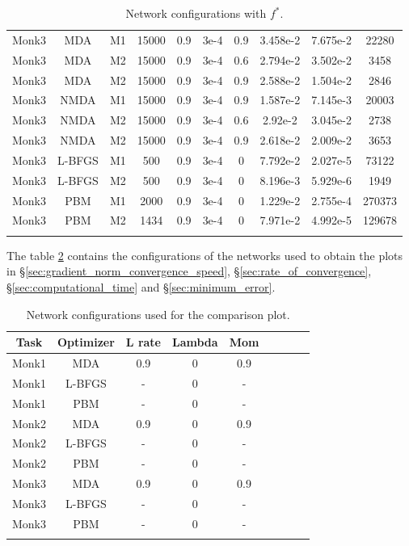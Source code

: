 \begin{center}
\begin{longtable}{|c|c|c|c|c|c|c|c|c|c|}
			Monk3 & MDA & M1 & 15000 & 0.9 & 3e-4  & 0.9 & 3.458e-2 & 7.675e-2 & 22280 \\
			Monk3 & MDA & M2 & 15000 & 0.9 & 3e-4  & 0.6 & 2.794e-2 & 3.502e-2 & 3458 \\
			Monk3 & MDA & M2 & 15000 & 0.9 & 3e-4  & 0.9 &  2.588e-2 & 1.504e-2 & 2846  \\
			Monk3 & NMDA & M1 & 15000 & 0.9 & 3e-4  & 0.9 & 1.587e-2 & 7.145e-3 & 20003 \\
			Monk3 & NMDA & M2 & 15000 & 0.9 & 3e-4  & 0.6 & 2.92e-2 & 3.045e-2 & 2738 \\
			Monk3 & NMDA & M2 & 15000 & 0.9 & 3e-4  & 0.9 & 2.618e-2 & 2.009e-2 & 3653 \\
			Monk3 & L-BFGS & M1 & 500 & 0.9 & 3e-4  & 0 & 7.792e-2 & 2.027e-5 & 73122 \\
			Monk3 & L-BFGS & M2 & 500 & 0.9 & 3e-4  & 0 & 8.196e-3 & 5.929e-6 & 1949 \\
			Monk3 & PBM & M1 & 2000 & 0.9 & 3e-4  & 0 & 1.229e-2 & 2.755e-4 & 270373 \\
			Monk3 & PBM & M2 & 1434 & 0.9 & 3e-4  & 0 & 7.971e-2 & 4.992e-5 & 129678  \\
			\hline
			\caption{Network configurations with $f^*$.}
			\label{tab:nets_res}
		\end{longtable}

\end{center}

The table \ref{tab:nets_comp} contains the configurations of the networks used to obtain the plots in \S \ref{sec:gradient_norm_convergence_speed}, \S \ref{sec:rate_of_convergence}, \S \ref{sec:computational_time} and \S \ref{sec:minimum_error}. 

\begin{center}
	\small\addtolength{\tabcolsep}{-3pt}
	\centering
	\begin{longtable}{|c|c|c|c|c|c|c|c|c|}
		\hline
		\textbf{Task}& \textbf{Optimizer} & \textbf{L rate} & \multicolumn{1}{l|}{\textbf{Lambda}} & \textbf{Mom}  \\ \hline 
		Monk1 & MDA & 0.9 & 0 & 0.9    \\
		Monk1 & L-BFGS & - & 0 & -    \\
		Monk1 & PBM & - & 0 & -    \\
		Monk2 & MDA & 0.9 & 0 & 0.9    \\
		Monk2 & L-BFGS & - & 0 & -    \\
		Monk2 & PBM & - & 0 & -    \\
		Monk3 & MDA & 0.9 & 0 & 0.9    \\
		Monk3 & L-BFGS & - & 0 & -    \\
		Monk3 & PBM & - & 0 & -    \\
		\hline
		\caption{Network configurations used for the comparison plot.}
		\label{tab:nets_comp}
	\end{longtable}
\end{center}


